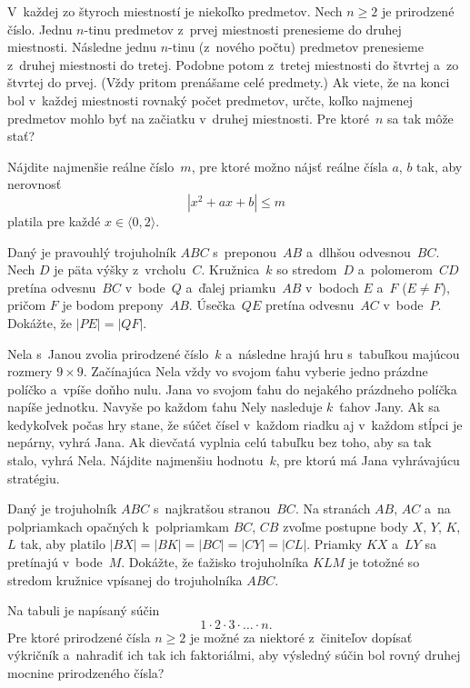 ﻿{%
V~každej zo štyroch miestností je niekoľko predmetov. Nech $n\ge2$ je prirodzené
číslo. Jednu $n$-tinu predmetov z~prvej miestnosti prenesieme do druhej miestnosti.
Následne jednu $n$-tinu (z~nového počtu) predmetov prenesieme z~druhej miestnosti do
tretej. Podobne potom z~tretej miestnosti do štvrtej a~zo štvrtej do prvej. (Vždy pritom
prenášame celé predmety.) Ak viete, že na konci bol v~každej miestnosti rovnaký počet predmetov, určte,
koľko najmenej predmetov mohlo byť na začiatku v~druhej miestnosti. Pre ktoré~$n$ sa tak môže stať?
}

{%
Nájdite najmenšie reálne číslo~$m$, pre ktoré možno nájsť reálne čísla $a$, $b$ tak,
aby nerovnosť
$$
|x^2+ax+b| \le m
$$
platila pre každé $x \in \langle 0, 2 \rangle$.
}

{%
Daný je pravouhlý trojuholník $ABC$ s~preponou~$AB$ a~dlhšou odvesnou~$BC$. Nech
$D$ je päta výšky z~vrcholu~$C$.
Kružnica~$k$ so stredom~$D$ a~polomerom~$CD$ pretína odvesnu~$BC$ v~bode~$Q$ a~ďalej
priamku~$AB$ v~bodoch $E$ a~$F$ ($E \ne F$),
pričom $F$ je bodom prepony~$AB$. Úsečka~$QE$ pretína odvesnu~$AC$ v~bode~$P$. Dokážte,
že $|PE|=|QF|$.}

{%
Nela s~Janou zvolia prirodzené číslo~$k$ a~následne hrajú hru s~tabuľkou
majúcou rozmery $9\times9$. Začínajúca Nela vždy vo svojom ťahu vyberie jedno prázdne
políčko a~vpíše doňho nulu. Jana vo svojom ťahu do nejakého prázdneho políčka
napíše jednotku. Navyše po každom ťahu Nely nasleduje $k$~ťahov Jany. Ak sa kedykoľvek
počas hry stane, že súčet čísel v~každom riadku aj v~každom stĺpci je nepárny, vyhrá
Jana. Ak dievčatá vyplnia celú tabuľku bez toho, aby sa tak stalo, vyhrá Nela. Nájdite
najmenšiu hodnotu~$k$, pre ktorú má Jana vyhrávajúcu stratégiu.
}

{%
Daný je trojuholník $ABC$ s~najkratšou stranou~$BC$. Na stranách $AB$,
$AC$ a~na polpriamkach opačných k~polpriamkam $BC$, $CB$ zvoľme postupne body $X$,
$Y$, $K$, $L$ tak, aby platilo $|BX| = |BK| = |BC| = |CY| = |CL|$. Priamky $KX$ a~$LY$ sa
pretínajú v~bode~$M$. Dokážte, že ťažisko trojuholníka $KLM$ je totožné so stredom
kružnice vpísanej do trojuholníka $ABC$.
}

{%
Na tabuli je napísaný súčin
$$
1 \cdot 2 \cdot 3 \cdot \dots \cdot n.
$$
Pre ktoré prirodzené čísla $n \ge 2$ je možné za niektoré z~činiteľov dopísať výkričník
a~nahradiť ich tak ich faktoriálmi, aby výsledný súčin bol rovný druhej
mocnine prirodzeného čísla?}

